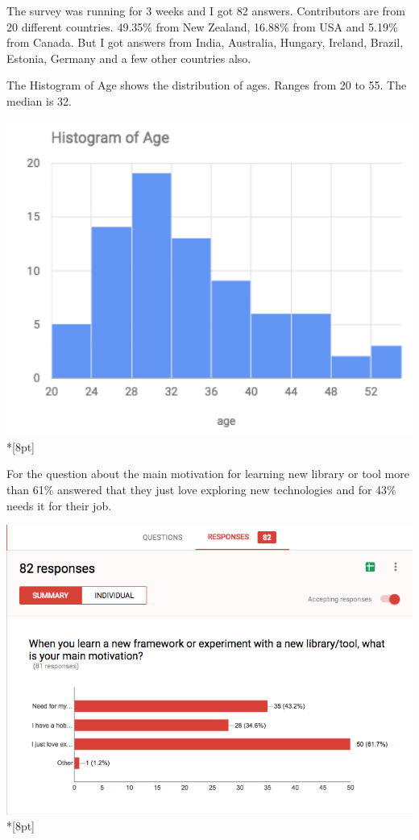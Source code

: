 \documentclass[12pt, a4paper, oneside, openright, medskipamount]{report}
\begin{document}
The survey was running for 3 weeks and I got 82 answers. Contributors are from 20 different countries. 49.35\% from New Zealand, 16.88\% from USA and 5.19\% from Canada. But I got answers from India, Australia, Hungary, Ireland, Brazil, Estonia, Germany and a few other countries also.

The Histogram of Age shows the distribution of ages. Ranges from 20 to 55. The median is 32.

\includegraphics[width=1\textwidth]{assets/survey-result/histogram-of-age.png}\\*[8pt]

For the question about the main motivation for learning new library or tool more than 61\% answered that they just love exploring new technologies and for 43\% needs it for their job.

\includegraphics[width=1\textwidth]{assets/survey-result/main-motivation.png}\\*[8pt]
\end{document}
